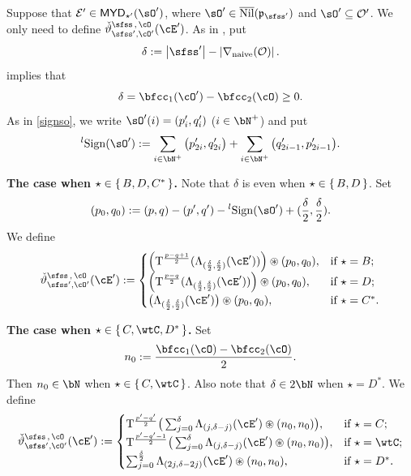 \documentclass[11pt,a4paper]{amsart}
\def\MYD{{\mathsf{MYD}}}
\def\abs#1{\left|{#1}\right|}
\newcommand{\CE}{{\mathcal {E}}}
\newcommand{\CO}{{\mathcal {O}}}
\newcommand{\p}{\mathfrak p}
\def\DD{\nabla}
\numberwithin{equation}{section}
\theoremstyle{remark}
\def\subset{\subseteq}
\def\Nil{\overline{\mathrm{Nil}}}
\def\lsign{{}^l\mathrm{Sign}}
\def\maltese{\mathrm{T}}
\def\MYD{{\mathsf{MYD}}}
\begin{document}
 Suppose that $\CE'\in\MYD_{\star '}(\sO')$, where $\sO'\in \Nil(\p_{\sfss'})$ and $\sO'\subset \CO'$.
 We only need to define $\dliftso (\cE')$.  
 As in , put
\[
 \delta:=  \abs{\sfss'}-\abs{\DD_\mathrm{naive}(\CO)}.
\]
  implies that
\[
\delta= \bfcc_{1}(\cO')-\bfcc_{2}(\cO)\geq 0.
\]
 As in \eqref{signso}, we write $\sO'(i)=( p'_i, q'_i)$ ($i\in \bN^+$) and put
\[
  \lsign(\sO') :=
    \sum_{i\in \bN^{+}} \big(p'_{2i},q'_{2i} \big)
      + \sum_{i\in \bN^{+}} \big(q'_{2i-1},p'_{2i-1} \big).
\]

{\bf The case when  $\star \in \set{B,D, C^{*}}$.} Note that $\delta$ is even when $\star\in \set{B,D}$. Set
\[
(p_{0}, q_{0})  := (p,q) -(p',q')-\lsign(\sO') + 
(\frac{\delta}{2},\frac{\delta}{2}).
\]
We define
\begin{equation}\label{eq:LCD}
  \dliftso(\cEp) :=
  \begin{cases}
  \left(\maltese^{\frac{p-q+1}{2}}(\Lambda_{(\frac{\delta}{2},\frac{\delta}{2})}( \cEp))\right)\circledast (p_{0},q_{0}), &
    \text{if } \star=B; \\
    \left(\maltese^{\frac{p-q}{2}}(\Lambda_{(\frac{\delta}{2},\frac{\delta}{2})}( \cEp))\right)\circledast (p_{0},q_{0}), &
    \text{if }  \star=D; \\
    \big(\Lambda_{(\frac{\delta}{2},\frac{\delta}{2})}( \cEp)\big)\circledast (p_{0},q_{0}), &
    \text{if } \star=C^{*}. \\
  \end{cases}
\end{equation}
 


{\bf The case when  $\star \in \set{C,\wtC,D^{*}}$.}
Set \[
n_{0} := \frac{\bfcc_{1}(\cO)-\bfcc_{2}(\cO)}{2}.
\]
Then $n_0\in \bN$ when $\star\in \set{C,\wtC}$. Also note that $\delta\in 2\bN$ when $\star=D^*$. We define
\begin{equation}\label{eq:LDC}
  \dliftso(\cEp) :=
  \begin{cases}
    \maltese^{\frac{p'-q'}{2}}\big(\sum_{j=0}^{\delta} \Lambda_{(j,\delta-j)}( \cEp)\circledast (n_{0},n_{0})\big), & \text{if
    } \star = C;\\
    \maltese^{\frac{p'-q'-1}{2}}\big(\sum_{j=0}^{\delta} \Lambda_{(j,\delta-j)}( \cEp)\circledast (n_{0},n_{0})\big), & \text{if
    } \star = \wtC;\\
    \sum_{j=0}^{\frac{\delta}{2}} \Lambda_{(2j,\delta-2j)}( \cEp)\circledast (n_{0},n_{0}),\quad & \text{if
    $\star = D^{*}$.}
  \end{cases}
\end{equation}
\end{document}
